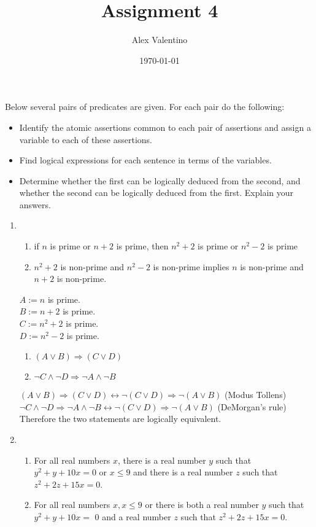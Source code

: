 \documentclass[12pt, letterpaper]{article}
\date{\today}
\author{Alex Valentino}
\title{Assignment 4}
\begin{document}
Below several pairs of predicates are given. For each pair do the following:
\begin{itemize}
	\item Identify the atomic assertions common to each pair of assertions and assign a variable to each of these assertions.
	\item  Find logical expressions for each sentence in terms of the variables.
	\item Determine whether the first can be logically deduced from the second, and whether the second can be logically deduced from the first. Explain your answers.
\end{itemize}
\begin{enumerate}
	\item \begin{enumerate}
	\item if $n$ is prime or $n+2$ is prime, then $n^2+2$ is prime or $n^2-2$ is prime
	\item $n^2+2$ is non-prime and $n^2-2$ is non-prime implies $n$ is non-prime and $n+2$ is non-prime.
	\end{enumerate}
	$A := n$ is prime.\\
	$B := n + 2$ is prime.\\
	$C := n^2 + 2$ is prime.\\
	$D := n^2 - 2$ is prime.\\
	\begin{enumerate}
	\item $(A \vee B) \Rightarrow (C \vee D)$
	\item $\neg C \wedge \neg D \Rightarrow \neg A \wedge \neg B$ 
	\end{enumerate}
	$(A \vee B) \Rightarrow (C \vee D) \leftrightarrow \neg (C \vee D) \Rightarrow \neg (A \vee B)$ (Modus Tollens)\\
	$\neg C \wedge \neg D \Rightarrow \neg A \wedge \neg B \leftrightarrow \neg (C \vee D) \Rightarrow \neg (A \vee B)$ (DeMorgan's rule)\\
	Therefore the two statements are logically equivalent.
	\item \begin{enumerate}
		\item  For all real numbers $x$, there is a real number $y$ such that $y^2+y+10 x=0$ or $x \leq 9$ and there is a real number $z$ such that $z^2+2 z+15 x=0$.
		\item For all real numbers $x, x \leq 9$ or there is both a real number $y$ such that $y^2+y+10 x=$ 0 and a real number $z$ such that $z^2+2 z+15 x=0$.

\end{enumerate}
\end{enumerate}
\end{document}
